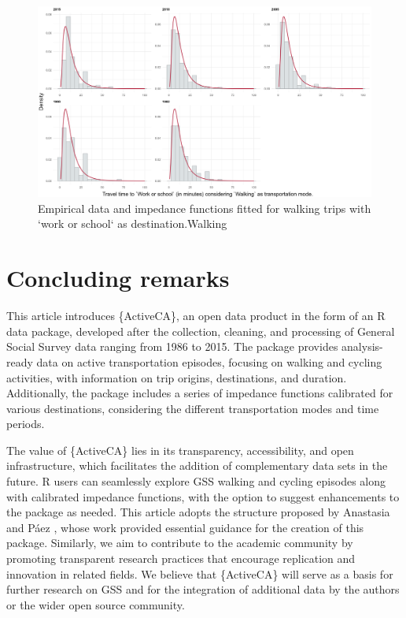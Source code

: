 \documentclass[Royal,times,sageh]{sagej}
\begin{document}
\begin{figure}

{\centering \includegraphics[width=1\linewidth]{Manuscript-figures/impf_Work or school_Walking} 

}

\caption{Empirical data and impedance functions fitted for walking trips with `work or school` as destination.Walking}\label{fig:figure-03}
\end{figure}

\hypertarget{concluding-remarks}{%
\section{Concluding remarks}\label{concluding-remarks}}

This article introduces \{ActiveCA\}, an open data product in the form
of an R data package, developed after the collection, cleaning, and
processing of General Social Survey data ranging from 1986 to 2015. The
package provides analysis-ready data on active transportation episodes,
focusing on walking and cycling activities, with information on trip
origins, destinations, and duration. Additionally, the package includes
a series of impedance functions calibrated for various destinations,
considering the different transportation modes and time periods.

The value of \{ActiveCA\} lies in its transparency, accessibility, and
open infrastructure, which facilitates the addition of complementary
data sets in the future. R users can seamlessly explore GSS walking and
cycling episodes along with calibrated impedance functions, with the
option to suggest enhancements to the package as needed. This article
adopts the structure proposed by Anastasia and Páez
\citeyearpar{soukhov2023}, whose work provided essential guidance for
the creation of this package. Similarly, we aim to contribute to the
academic community by promoting transparent research practices that
encourage replication and innovation in related fields. We believe that
\{ActiveCA\} will serve as a basis for further research on GSS and for
the integration of additional data by the authors or the wider open
source community.
\end{document}
